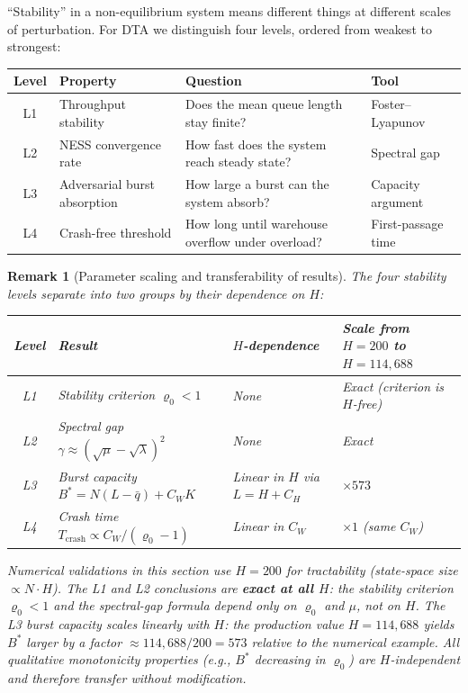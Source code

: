 \documentclass[11pt,a4paper]{report}
\newtheorem{remark}{Remark}[section]
\begin{document}
\begingroup\let\rho\varrho
``Stability'' in a non-equilibrium system means different things at different
scales of perturbation.
For DTA we distinguish four levels, ordered from weakest to strongest:

\smallskip
\begin{center}
\begin{tabularx}{\textwidth}{@{}clXl@{}}
\toprule
Level & Property & Question & Tool \\
\midrule
L1 & Throughput stability & Does the mean queue length stay finite?
   & Foster--Lyapunov~\cite{foster1953,meyn2009} \\
L2 & NESS convergence rate & How fast does the system reach steady state?
   & Spectral gap \\
L3 & Adversarial burst absorption & How large a burst can the system absorb?
   & Capacity argument \\
L4 & Crash-free threshold & How long until warehouse overflow under overload?
   & First-passage time \\
\bottomrule
\end{tabularx}
\end{center}
\smallskip

\begin{remark}[Parameter scaling and transferability of results]
\label{rem:H_scaling}
The four stability levels separate into two groups by their dependence on $H$:

\medskip
\begin{center}
\begin{tabularx}{\textwidth}{@{}clXl@{}}
\toprule
Level & Result & $H$-dependence & Scale from $H{=}200$ to $H{=}114{,}688$ \\
\midrule
L1 & Stability criterion $\varrho_0 < 1$ & None & Exact (criterion is $H$-free) \\
L2 & Spectral gap $\gamma \approx (\sqrt{\mu}-\sqrt{\lambda})^2$ & None & Exact \\
L3 & Burst capacity $B^* = N(L - \bar q) + C_W K$ & Linear in $H$ via $L = H + C_H$ & $\times 573$ \\
L4 & Crash time $T_{\mathrm{crash}} \propto C_W / (\varrho_0 - 1)$ & Linear in $C_W$ & $\times 1$ (same $C_W$) \\
\bottomrule
\end{tabularx}
\end{center}

\medskip
Numerical validations in this section use $H = 200$ for tractability
(state-space size $\propto N \cdot H$).  The L1 and L2 conclusions are
\textbf{exact at all $H$}: the stability criterion $\varrho_0 < 1$ and the
spectral-gap formula depend only on $\varrho_0$ and $\mu$, not on $H$.
The L3 burst capacity scales \emph{linearly} with $H$:
the production value $H = 114{,}688$ yields $B^*$ larger by a factor
$\approx 114{,}688 / 200 = 573$ relative to the numerical example.
All qualitative monotonicity properties (e.g., $B^*$ decreasing in $\varrho_0$)
are $H$-independent and therefore transfer without modification.
\end{remark}
\end{document}
